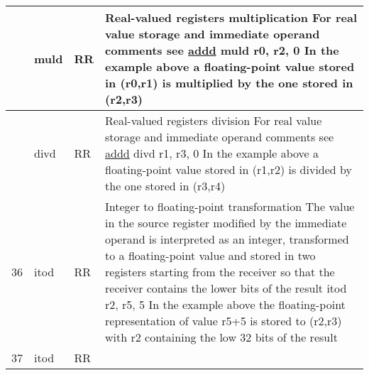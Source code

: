 \documentclass{article}
\newcommand{\St}[1]{{\fontfamily{qcr}\selectfont #1}}
\newcommand{\Ss}[1]{{\fontfamily{cmss}\selectfont #1}}
\begin{document}
{\begin{table*}[h!]
\begin{tabular}{| >{\centering\arraybackslash} m{1cm} | >{\centering\arraybackslash} m{1.4cm} | >{\centering\arraybackslash} m{1.2cm} | m{11.6cm} |}
 \hline
 
 34 & \St{muld} & \Ss{RR} &
 
 Real-valued registers multiplication \newline
 For real value storage and immediate operand comments see \hyperlink{addd}{\St{addd}} \newline
 \St{muld r0, r2, 0} \newline
 In the example above a floating-point value stored in \St{(r0,r1})\newline
 is multiplied by the one stored in \St{(r2,r3})\\
 
 \hline
 
 35 & \St{divd} & \Ss{RR} &
 
 Real-valued registers division \newline
 For real value storage and immediate operand comments see \hyperlink{addd}{\St{addd}} \newline
 \St{divd r1, r3, 0} \newline
 In the example above a floating-point value stored in \St{(r1,r2})\newline
 is divided by the one stored in \St{(r3,r4})\\
 
 \hline
 
 36 & \St{itod} & \Ss{RR} &
 
 Integer to floating-point transformation \newline
 The value in the source register modified by the immediate operand \newline
 is interpreted as an integer, transformed to a floating-point value and \newline
 stored in two registers starting from the receiver so that the receiver \newline
 contains the lower bits of the result \newline
 \St{itod r2, r5, 5} \newline
 In the example above the floating-point representation of value \St{r5+5} \newline
 is stored to \St{(r2,r3)} with \St{r2} containing the low 32 bits of the result\\
 
 \hline
 
 37 & \St{itod} & \Ss{RR} &
 

\end{tabular}
\end{table*}}
\end{document}
